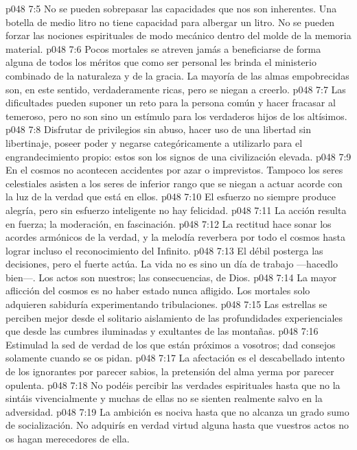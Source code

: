 \vs p048 7:5 No se pueden sobrepasar las capacidades que nos son inherentes. Una botella de medio litro no tiene capacidad para albergar un litro. No se pueden forzar las nociones espirituales de modo mecánico dentro del molde de la memoria material.
\vs p048 7:6 Pocos mortales se atreven jamás a beneficiarse de forma alguna de todos los méritos que como ser personal les brinda el ministerio combinado de la naturaleza y de la gracia. La mayoría de las almas empobrecidas son, en este sentido, verdaderamente ricas, pero se niegan a creerlo.
\vs p048 7:7 Las dificultades pueden suponer un reto para la persona común y hacer fracasar al temeroso, pero no son sino un estímulo para los verdaderos hijos de los altísimos.
\vs p048 7:8 Disfrutar de privilegios sin abuso, hacer uso de una libertad sin libertinaje, poseer poder y negarse categóricamente a utilizarlo para el engrandecimiento propio: estos son los signos de una civilización elevada.
\vs p048 7:9 En el cosmos no acontecen accidentes por azar o imprevistos. Tampoco los seres celestiales asisten a los seres de inferior rango que se niegan a actuar acorde con la luz de la verdad que está en ellos.
\vs p048 7:10 El esfuerzo no siempre produce alegría, pero sin esfuerzo inteligente no hay felicidad.
\vs p048 7:11 La acción resulta en fuerza; la moderación, en fascinación.
\vs p048 7:12 La rectitud hace sonar los acordes armónicos de la verdad, y la melodía reverbera por todo el cosmos hasta lograr incluso el reconocimiento del Infinito.
\vs p048 7:13 El débil posterga las decisiones, pero el fuerte actúa. La vida no es sino un día de trabajo ---hacedlo bien---. Los actos son nuestros; las consecuencias, de Dios.
\vs p048 7:14 La mayor aflicción del cosmos es no haber estado nunca afligido. Los mortales solo adquieren sabiduría experimentando tribulaciones.
\vs p048 7:15 Las estrellas se perciben mejor desde el solitario aislamiento de las profundidades experienciales que desde las cumbres iluminadas y exultantes de las montañas.
\vs p048 7:16 Estimulad la sed de verdad de los que están próximos a vosotros; dad consejos solamente cuando se os pidan.
\vs p048 7:17 La afectación es el descabellado intento de los ignorantes por parecer sabios, la pretensión del alma yerma por parecer opulenta.
\vs p048 7:18 No podéis percibir las verdades espirituales hasta que no la sintáis vivencialmente y muchas de ellas no se sienten realmente salvo en la adversidad.
\vs p048 7:19 La ambición es nociva hasta que no alcanza un grado sumo de socialización. No adquirís en verdad virtud alguna hasta que vuestros actos no os hagan merecedores de ella.
